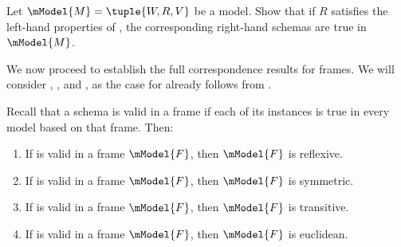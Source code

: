 \documentclass[../../../include/open-logic-section]{subfiles}
\begin{document}
\begin{prob}
  Let $\mModel{M} = \tuple{W, R, V}$ be a model. Show that if $R$
  satisfies the left-hand properties of
  , the corresponding
  right-hand schemas are true in~$\mModel{M}$.
\end{prob}

We now proceed to establish the full correspondence results for
frames. We will consider , ,  and , as the case
for  already follows from .

\begin{thm}
  Recall that a schema  is valid in a frame  if each of
  its instances is true in every model based on that frame. Then:
  \begin{enumerate}
  \item If  is valid in a frame $\mModel{F}$, then
    $\mModel{F}$ is reflexive.
  \item If  is valid in a frame $\mModel{F}$, then
    $\mModel{F}$ is symmetric.
  \item If  is valid in a frame $\mModel{F}$, then
    $\mModel{F}$ is transitive.
  \item If  is valid in a frame $\mModel{F}$, then
    $\mModel{F}$ is euclidean.
  \end{enumerate}
\end{thm}
\end{document}

